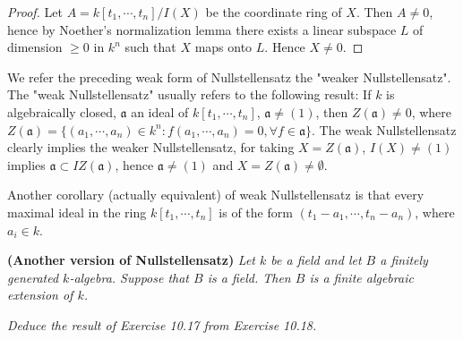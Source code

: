 \begin{proof}
Let $A=k[t_1,\cdots,t_n]/I(X)$ be the coordinate ring of $X$. Then $A\ne 0$, hence by Noether's normalization lemma there exists a linear subspace $L$ of dimension $\ge 0$ in $k^n$ such that $X$ maps onto $L$. Hence $X\ne 0$.
\end{proof}
\begin{note}\par
We refer the preceding weak form of Nullstellensatz the "weaker Nullstellensatz". The "weak Nullstellensatz" usually refers to the following result: If $k$ is algebraically closed, $\mathfrak{a}$ an ideal of $k[t_1,\cdots,t_n]$, $\mathfrak{a}\ne (1)$, then $Z(\mathfrak{a})\ne 0$, where $Z(\mathfrak{a})=\{(a_1,\cdots,a_n)\in k^n:f(a_1,\cdots,a_n)=0,\forall f\in\mathfrak{a}\}$. The weak Nullstellensatz clearly implies the weaker Nullstellensatz, for taking $X=Z(\mathfrak{a})$, $I(X)\ne (1)$ implies $\mathfrak{a}\subset IZ(\mathfrak{a})$, hence $\mathfrak{a}\ne (1)$ and $X=Z(\mathfrak{a})\ne\emptyset$.\par
Another corollary (actually equivalent) of weak Nullstellensatz is that every maximal ideal in the ring $k[t_1,\cdots,t_n]$ is of the form $(t_1-a_1,\cdots,t_n-a_n)$, where $a_i\in k$.
\end{note}
\begin{problem}\textbf{(Another version of Nullstellensatz)}\em
Let $k$ be a field and let $B$ a finitely generated $k$-algebra. Suppose that $B$ is a field. Then $B$ is a finite algebraic extension of $k$.
\end{problem}
\begin{problem}\em
Deduce the result of Exercise 10.17 from Exercise 10.18.
\end{problem}